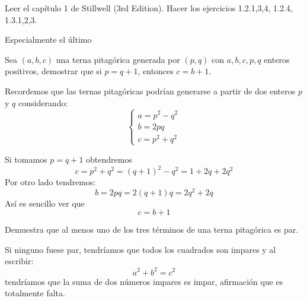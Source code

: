 \begin{problem}[9]
Leer el capítulo 1 de Stillwell (3rd Edition). Hacer los ejercicios 1.2.{1,3,4}, 1.2.4, 1.3.{1,2,3}.

Especialmente el último

\solution

\end{problem}

\begin{problem}[10]
Sea $(a,b,c)$ una terna pitagórica generada por $(p,q)$ con $a,b,c,p,q$ enteros positivos, demostrar que si $p=q+1$, entonces $c=b+1$.

\solution
{}

Recordemos que las ternas pitagóricas podrían generarse a partir de dos enteros $p$ y $q$ considerando:
\[\left\{ \begin{array}{l} a=p^2-q^2 \\ b=2pq \\ c=p^2+q^2 \end{array} \right.\]

Si tomamos $p=q+1$ obtendremos
\[c=p^2+q^2=(q+1)^2-q^2=1+2q+2q^2\]
Por otro lado tendremos:
\[b=2pq=2(q+1)q=2q^2+2q\]
Así es sencillo ver que
\[c=b+1\]
\end{problem}

\begin{problem}[11]
Demuestra que al menos uno de los tres términos de una terna pitagórica es par.

\solution


Si ninguno fuese par, tendríamos que todos los cuadrados son impares y al escribir:
\[a^2+b^2=c^2\]
tendríamos que la suma de dos números impares es impar, afirmación que es totalmente falta.
\end{problem}